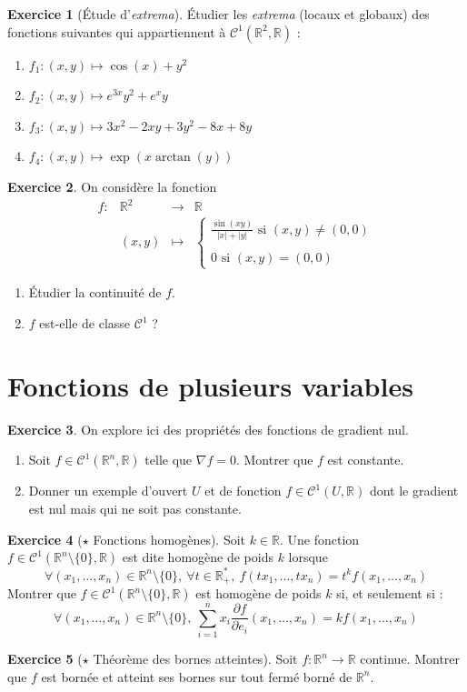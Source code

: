 \documentclass[french]{book}
\newcommand{\R}{\mathbb{R}}
\newcommand{\st}{^*}
\theoremstyle{definition}
\newtheorem{ex}{Exercice}[chapter]
\theoremstyle{theorem}
\theoremstyle{remark}
\begin{document}
\begin{ex}[Étude d'\textit{extrema}]
	Étudier les \textit{extrema} (locaux et globaux) des fonctions suivantes qui appartiennent à $\mathcal{C}^1(\R^2,\R)$ :
	\begin{enumerate}
		\item $f_1:(x,y)\mapsto\cos(x)+y^2$
		\item $f_2:(x,y)\mapsto e^{3x}y^2+e^xy$
		\item $f_3:(x,y)\mapsto3x^2-2xy+3y^2-8x+8y$
		\item $f_4:(x,y)\mapsto\exp(x\arctan(y))$
	\end{enumerate}
\end{ex}

\begin{ex}
	On considère la fonction $$\begin{array}{lrcl}
		f:&\R^2&\longrightarrow&\R \\
		&(x,y)&\longmapsto&\begin{cases}
			\displaystyle\frac{\sin(xy)}{\lvert x\rvert+\lvert y\rvert}\text{ si }(x,y)\ne(0,0) \\ \\
			0\text{ si }(x,y)=(0,0)
		\end{cases}
	\end{array}$$
	\begin{enumerate}
		\item Étudier la continuité de $f$.
		\item $f$ est-elle de classe $\mathcal{C}^1$ ?
	\end{enumerate}
\end{ex}

\section{Fonctions de plusieurs variables}

\begin{ex}
	On explore ici des propriétés des fonctions de gradient nul.
	\begin{enumerate}
		\item Soit $f\in\mathcal{C}^1(\R^n,\R)$ telle que $\nabla f=0$. Montrer que $f$ est constante.
		\item Donner un exemple d'ouvert $U$ et de fonction $f\in\mathcal{C}^1(U,\R)$ dont le gradient est nul mais qui ne soit pas constante.
	\end{enumerate}
\end{ex}

\begin{ex}[$\star$ Fonctions homogènes]
	Soit $k\in\R$. Une fonction $f\in\mathcal{C}^1(\R^n\setminus\{0\},\R)$ est dite homogène de poids $k$ lorsque $$\forall (x_1,\ldots,x_n)\in\R^n\setminus\{0\},\ \forall t\in\R_+\st,\ f(tx_1,\ldots,tx_n)=t^kf(x_1,\ldots,x_n)$$ Montrer que $f\in\mathcal{C}^1(\R^n\setminus\{0\},\R)$ est homogène de poids $k$ si, et seulement si : $$\forall (x_1,\ldots,x_n)\in\R^n\setminus\{0\},\ \sum_{i=1}^{n}x_i\frac{\partial f}{\partial e_i}(x_1,\ldots,x_n)=kf(x_1,\ldots,x_n)$$
\end{ex}

\begin{ex}[$\star$ Théorème des bornes atteintes]
	Soit $f:\R^n\to\R$ continue. Montrer que $f$ est bornée et atteint ses bornes sur tout fermé borné de $\R^n$.
\end{ex}
\end{document}
